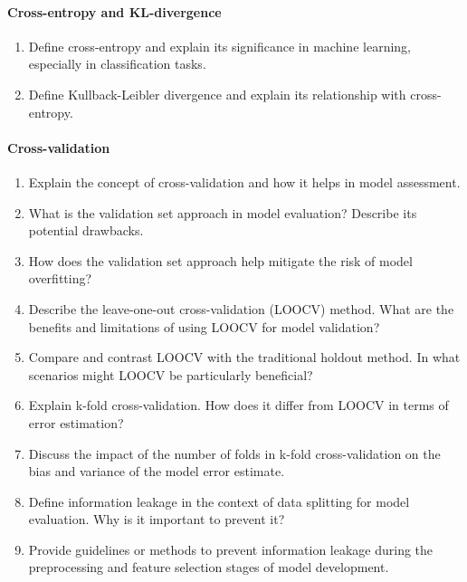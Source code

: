 \paragraph*{Cross-entropy and KL-divergence}
\begin{enumerate}
  \item Define cross-entropy and explain its significance in machine learning, especially in classification tasks.
  \item Define Kullback-Leibler divergence and explain its relationship with cross-entropy.
\end{enumerate}
\paragraph*{Cross-validation}
\begin{enumerate}
    \item Explain the concept of cross-validation and how it helps in model assessment.
    \item What is the validation set approach in model evaluation? Describe its potential drawbacks.
    \item How does the validation set approach help mitigate the risk of model overfitting?
    \item Describe the leave-one-out cross-validation (LOOCV) method. What are the benefits and limitations of using LOOCV for model validation?
    \item Compare and contrast LOOCV with the traditional holdout method. In what scenarios might LOOCV be particularly beneficial?
    \item Explain k-fold cross-validation. How does it differ from LOOCV in terms of error estimation?
    \item Discuss the impact of the number of folds in k-fold cross-validation on the bias and variance of the model error estimate.
    \item Define information leakage in the context of data splitting for model evaluation. Why is it important to prevent it?
    \item Provide guidelines or methods to prevent information leakage during the preprocessing and feature selection stages of model development.
\end{enumerate}
